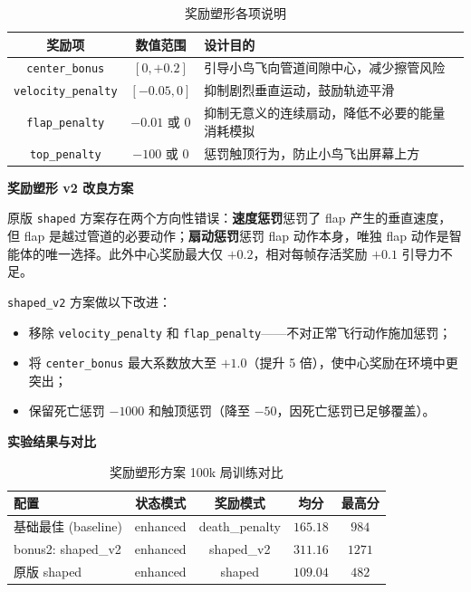 \documentclass[12pt]{article}
\begin{document}
\begin{table}[H]
	\centering
	\caption{奖励塑形各项说明}
	\label{tab:shaped_explain}
	\begin{tabular}{ccp{6cm}}
		\toprule
		奖励项 & 数值范围 & 设计目的 \\
		\midrule
		\texttt{center\_bonus} & $[0, +0.2]$ & 引导小鸟飞向管道间隙中心，减少擦管风险 \\
		\texttt{velocity\_penalty} & $[-0.05, 0]$ & 抑制剧烈垂直运动，鼓励轨迹平滑 \\
		\texttt{flap\_penalty} & $-0.01$ 或 $0$ & 抑制无意义的连续扇动，降低不必要的能量消耗模拟 \\
		\texttt{top\_penalty} & $-100$ 或 $0$ & 惩罚触顶行为，防止小鸟飞出屏幕上方 \\
		\bottomrule
	\end{tabular}
\end{table}

\textbf{奖励塑形 v2 改良方案}

原版 \texttt{shaped} 方案存在两个方向性错误：\textbf{速度惩罚}惩罚了 flap 产生的垂直速度，但 flap 是越过管道的必要动作；\textbf{扇动惩罚}惩罚 flap 动作本身，唯独 flap 动作是智能体的唯一选择。此外中心奖励最大仅 $+0.2$，相对每帧存活奖励 $+0.1$ 引导力不足。

\texttt{shaped\_v2} 方案做以下改进：

\begin{itemize}
	\item 移除 \texttt{velocity\_penalty} 和 \texttt{flap\_penalty}——不对正常飞行动作施加惩罚；
	\item 将 \texttt{center\_bonus} 最大系数放大至 $+1.0$（提升 5 倍），使中心奖励在环境中更突出；
	\item 保留死亡惩罚 $-1000$ 和触顶惩罚（降至 $-50$，因死亡惩罚已足够覆盖）。
\end{itemize}

\textbf{实验结果与对比}

\begin{table}[H]
	\centering
	\caption{奖励塑形方案 100k 局训练对比}
	\label{tab:reward_compare}
	\begin{tabular}{lcccc}
		\toprule
		配置 & 状态模式 & 奖励模式 & 均分 & 最高分 \\
		\midrule
		基础最佳 (baseline) & enhanced & death\_penalty & $165.18$ & $984$ \\
		bonus2: shaped\_v2 & enhanced & shaped\_v2 & $\mathbf{311.16}$ & $1271$ \\
		\quad 原版 shaped & enhanced & shaped & $109.04$ & $482$ \\
		\bottomrule
	\end{tabular}
\end{table}
\end{document}
